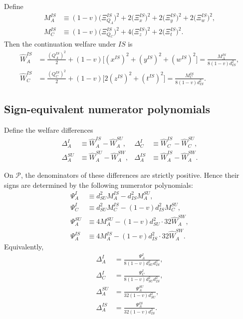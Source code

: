 Define
\begin{align}
M_A^{IS}
&\equiv
(1-v)\big(\Xi_{Q_A}^{IS}\big)^2
+2\big(\Xi_x^{IS}\big)^2
+2\big(\Xi_y^{IS}\big)^2
+2\big(\Xi_w^{IS}\big)^2, \label{eq:MA_is}\\
M_C^{IS}
&\equiv
(1-v)\big(\Xi_{Q_C}^{IS}\big)^2
+4\big(\Xi_z^{IS}\big)^2
+2\big(\Xi_t^{IS}\big)^2. \label{eq:MC_is}
\end{align}
Then the continuation welfare under $IS$ is
\begin{align}
\widehat W_A^{IS}
&=
\frac{(Q_A^{IS})^2}{2}
+
(1-v)\Big[(x^{IS})^2+(y^{IS})^2+(w^{IS})^2\Big]
=
\frac{M_A^{IS}}{8(1-v)d_{IS}^2}, \label{eq:WA_is_appendix}\\
\widehat W_C^{IS}
&=
\frac{(Q_C^{IS})^2}{2}
+
(1-v)\Big[2(z^{IS})^2+(t^{IS})^2\Big]
=
\frac{M_C^{IS}}{8(1-v)d_{IS}^2}. \label{eq:WC_is_appendix}
\end{align}

\subsection{Sign-equivalent numerator polynomials}

Define the welfare differences
\begin{align}
\Delta_A^I &\equiv \widehat W_A^{IS}-\widehat W_A^{SU}, &
\Delta_C^I &\equiv \widehat W_C^{IS}-\widehat W_C^{SU}, \label{eq:deltas_appendix1}\\
\Delta_A^{SU} &\equiv \widehat W_A^{SU}-\widehat W_A^{SW}, &
\Delta_A^{IS} &\equiv \widehat W_A^{IS}-\widehat W_A^{SW}. \label{eq:deltas_appendix2}
\end{align}

On $\mathcal P$, the denominators of these differences are strictly positive. Hence their signs are determined by the following numerator polynomials:
\begin{align}
\Psi_A^I
&\equiv
d_{SU}^2 M_A^{IS}
-
d_{IS}^2 M_A^{SU}, \label{eq:Psi_AI}\\
\Psi_C^I
&\equiv
d_{SU}^2 M_C^{IS}
-
(1-v)d_{IS}^2 M_C^{SU}, \label{eq:Psi_CI}\\
\Psi_A^{SU}
&\equiv
4M_A^{SU}
-
(1-v)d_{SU}^2 \cdot 32\widehat W_A^{SW}, \label{eq:Psi_ASU}\\
\Psi_A^{IS}
&\equiv
4M_A^{IS}
-
(1-v)d_{IS}^2 \cdot 32\widehat W_A^{SW}. \label{eq:Psi_AIS}
\end{align}
Equivalently,
\begin{align}
\Delta_A^I
&=
\frac{\Psi_A^I}{8(1-v)d_{SU}^2 d_{IS}^2}, \label{eq:DeltaAI_num}\\
\Delta_C^I
&=
\frac{\Psi_C^I}{8(1-v)d_{SU}^2 d_{IS}^2}, \label{eq:DeltaCI_num}\\
\Delta_A^{SU}
&=
\frac{\Psi_A^{SU}}{32(1-v)d_{SU}^2}, \label{eq:DeltaASU_num}\\
\Delta_A^{IS}
&=
\frac{\Psi_A^{IS}}{32(1-v)d_{IS}^2}. \label{eq:DeltaAIS_num}
\end{align}

